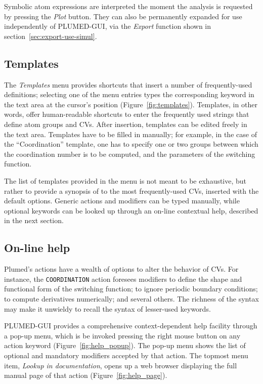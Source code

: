 \documentclass[preprint,review,11pt]{elsarticle}
\begin{document}
Symbolic atom expressions are interpreted the moment the analysis is
requested by pressing the \emph{Plot} button. They can also be
permanently expanded for use independently of PLUMED-GUI, via the
\emph{Export} function shown in section~\ref{sec:export-use-simul}.



\subsection{Templates}

The \emph{Templates} menu provides shortcuts that insert a number of
frequently-used definitions; selecting one of the menu entries types
the corresponding keyword in the text area at the cursor's position
(Figure~\ref{fig:templates}). Templates, in other words, offer
human-readable shortcuts to enter the frequently used strings that
define atom groups and CVs. After insertion, templates can be edited
freely in the text area.
Templates have to be filled in  manually; for example, in the
case of the ``Coordination'' template, one has to specify one or two
groups between which the coordination number is to be computed, and
the parameters of the switching function.

The list of templates provided in the menu is not meant to be
exhaustive, but rather to provide a synopsis of to the most
frequently-used CVs, inserted with the default options. Generic
actions and modifiers can be typed manually, while optional keywords
can be looked up through an on-line contextual help, described
in the next section.


\subsection{On-line help}

Plumed's actions have a wealth of options to alter the
behavior of CVs. For instance, the \texttt{COORDINATION} action
foresees modifiers to define the shape and functional form of the
switching function; to ignore periodic boundary conditions; to compute
derivatives numerically; and several others. The richness of the
syntax may make it unwieldy to recall the syntax of lesser-used
keywords.


PLUMED-GUI provides a comprehensive context-dependent help facility
through a pop-up menu, which is be invoked pressing the right mouse
button on any action keyword (Figure~\ref{fig:help_popup}). The pop-up
menu shows the list of optional and mandatory modifiers accepted by
that action.  The topmost menu item, \emph{Lookup in documentation},
opens up a web browser  displaying the full manual page of that action
(Figure~\ref{fig:help_page}).
\end{document}
